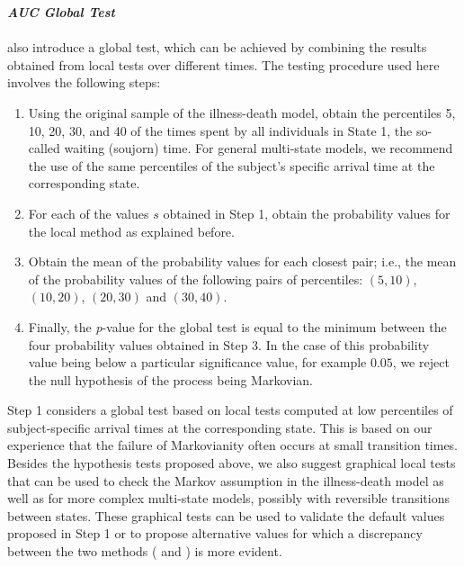 \textit{\textbf{AUC Global Test}}\\\\
\cite{soutinho_machado2020} also introduce a global test, which can be achieved by combining the results obtained from local tests over different times. The testing procedure used here involves the following steps:

\begin{enumerate}

\item Using the original sample of the illness-death model, obtain the percentiles 5, 10, 20, 30, and 40 of the times spent by all individuals in State 1, the so-called waiting (soujorn) time. For general multi-state models, we recommend the use of the same percentiles of the subject's specific arrival time at the corresponding state.

\item For each of the values $s$ obtained in Step 1, obtain the probability values for the local method as explained before.

\item Obtain the mean of the probability values for each closest pair; i.e., the mean of the probability values of the following pairs of percentiles: $(5,10)$, $(10,20)$, $(20,30)$ and $(30,40)$.

\item Finally, the \textit{p}-value for the global test is equal to the minimum between the four probability values obtained in Step 3. In the case of this probability value being below a particular significance value, for example $0.05$, we reject the null hypothesis of the process being Markovian.
\end{enumerate}

Step 1 considers a global test based on local tests computed at low percentiles of subject-specific arrival times at the corresponding state. This is based on our experience that the failure of Markovianity often occurs at small transition times. Besides the hypothesis tests proposed above, we also suggest graphical local tests that can be used to check the Markov assumption in the illness-death model as well as for more complex multi-state models, possibly with reversible transitions between states. These graphical tests can be used to validate the default values proposed in Step 1 or to propose alternative values for which a discrepancy between the two methods ( and ) is more evident. 

